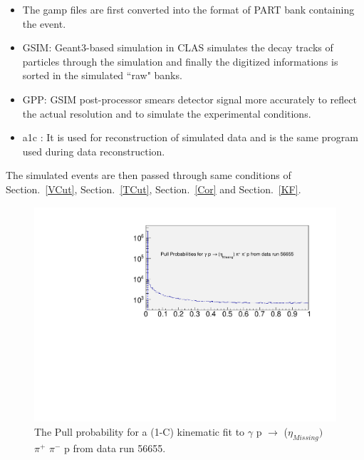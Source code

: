 \documentclass[12pt,a4paper]{amsbook}
\theoremstyle{definition}
\begin{document}
{\begin {itemize}
\item The gamp files are first converted into the format of PART bank containing the event.
\item GSIM:  Geant3-based simulation in CLAS simulates the decay tracks of particles through the simulation and finally the digitized informations is sorted in the simulated ``raw" banks.
\item GPP: GSIM post-processor smears detector signal more accurately to reflect the actual resolution and to simulate the experimental conditions.  
\item a1c : It is used for reconstruction of simulated data and is the same program used during data reconstruction.
\end {itemize}

The simulated events are then passed through same conditions of Section.~\ref{VCut}, Section.~\ref{TCut}, Section.~\ref{Cor} and Section.~\ref{KF}.
  
\begin{figure}[ht!]
\centerline{
\includegraphics[width=12cm,height=8cm]{Prob_etafit.pdf}}
\caption{The Pull probability for a (1-C) kinematic fit to $\gamma$ p $\rightarrow$ ($\eta_{Missing})$ $\pi^{+}$ $\pi^{-}$ p from data run 56655.}
\label{Fig5}
\end{figure}
 
}
\end{document}
